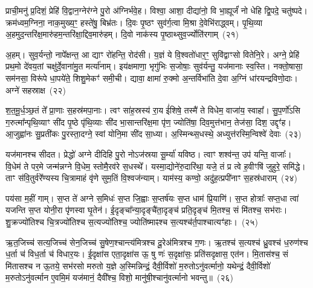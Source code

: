 {\anuvakamend[{दी॒या॒ दा॒यो ज॑यन्त्व॒मित्रा॒न्प्र च॑त्वारि॒ꣳ॒शच्च॑}]}%

प्राची॒मनु॑ प्र॒दिशं॒ प्रेहि॑ वि॒द्वान॒ग्नेर॑ग्ने पु॒रो अ॑ग्निर्भवे॒ह। विश्वा॒ आशा॒ दीद्या॑नो॒ वि भा॒ह्यूर्जं॑ नो धेहि द्वि॒पदे॒ चतु॑ष्पदे। क्रम॑ध्वम॒ग्निना॒ नाक॒मुख्य॒ꣳ॒ हस्ते॑षु॒ बिभ्र॑तः। दि॒वः पृ॒ष्ठꣳ सुव॑र्ग॒त्वा मि॒श्रा दे॒वेभि॑राद्ध्वम्। पृ॒थि॒व्या अ॒हमुद॒न्तरि॑क्ष॒मारु॑हम॒न्तरि॑क्षा॒द्दिव॒मारु॑हम्। दि॒वो नाक॑स्य पृ॒ष्ठाथ्सुव॒र्ज्योति॑रगाम्~(२१)

अ॒हम्। सुव॒र्यन्तो॒ नापे᳚क्षन्त॒ आ द्याꣳ रो॑हन्ति॒ रोद॑सी। य॒ज्ञं ये वि॒श्वतो॑धार॒ꣳ॒ सुवि॑द्वाꣳसो वितेनि॒रे। अग्ने॒ प्रेहि॑ प्रथ॒मो दे॑वय॒तां चक्षु॑र्दे॒वाना॑मु॒त मर्त्या॑नाम्। इय॑क्षमाणा॒ भृगु॑भिः स॒जोषाः॒ सुव॑र्यन्तु॒ यज॑मानाः स्व॒स्ति। नक्तो॒षासा॒ सम॑नसा॒ विरू॑पे धा॒पये॑ते॒ शिशु॒मेकꣳ॑ समी॒ची। द्यावा॒ क्षामा॑ रु॒क्मो अ॒न्तर्विभा॑ति दे॒वा अ॒ग्निं धा॑रयन्द्रविणो॒दाः। अग्ने॑ सहस्राक्ष~(२२)

श॒त॒मू॒र्ध॒ञ्छ॒तं ते᳚ प्रा॒णाः स॒हस्र॑मपा॒नाः। त्वꣳ सा॑ह॒स्रस्य॑ रा॒य ई॑शिषे॒ तस्मै॑ ते विधेम॒ वाजा॑य॒ स्वाहा᳚। सु॒प॒र्णो॑\-ऽसि ग॒रुत्मा᳚न्पृथि॒व्याꣳ सी॑द पृ॒ष्ठे पृ॑थि॒व्याः सी॑द भा॒सान्तरि॑क्ष॒मा पृ॑ण॒ ज्योति॑षा॒ दिव॒मुत्त॑भान॒ तेज॑सा॒ दिश॒ उद्दृꣳ॑ह। आ॒जुह्वा॑नः सु॒प्रती॑कः पु॒रस्ता॒दग्ने॒ स्वां योनि॒मा सी॑द सा॒ध्या। अ॒स्मिन्थ्स॒धस्थे॒ अध्युत्त॑रस्मि॒न्विश्वे॑ देवाः~(२३)

यज॑मानश्च सीदत। प्रेद्धो॑ अग्ने दीदिहि पु॒रो नो\-ऽज॑स्रया सू॒र्म्या॑ यविष्ठ। त्वाꣳ शश्व॑न्त॒ उप॑ यन्ति॒ वाजाः᳚। वि॒धेम॑ ते पर॒मे जन्म॑न्नग्ने वि॒धेम॒ स्तोमै॒रव॑रे स॒धस्थे᳚। यस्मा॒द्योने॑रु॒दारि॑था॒ यजे॒ तं प्र त्वे ह॒वीꣳषि॑ जुहुरे॒ समि॑द्धे। ताꣳ स॑वि॒तुर्वरे᳚ण्यस्य चि॒त्रामाहं वृ॑णे सुम॒तिं वि॒श्वज॑न्याम्। याम॑स्य॒ कण्वो॒ अदु॑ह॒त्प्रपी॑नाꣳ स॒हस्र॑धाराम्~(२४)

पय॑सा म॒हीं गाम्। स॒प्त ते॑ अग्ने स॒मिधः॑ स॒प्त जि॒ह्वाः स॒प्तर्\mbox{}ष॑यः स॒प्त धाम॑ प्रि॒याणि॑। स॒प्त होत्राः᳚ सप्त॒धा त्वा॑ यजन्ति स॒प्त योनी॒रा पृ॑णस्वा घृ॒तेन॑। ई॒दृङ्चा᳚न्या॒दृङ्चै॑ता॒दृङ्च॑ प्रति॒दृङ्च॑ मि॒तश्च॒ सं मि॑तश्च॒ सभ॑राः। शु॒क्रज्यो॑तिश्च चि॒त्रज्यो॑तिश्च स॒त्यज्यो॑तिश्च॒ ज्योति॑ष्माꣴश्च स॒त्यश्च॑र्त॒पाश्चात्यꣳ॑हाः।~(२५)

ऋ॒त॒जिच्च॑ सत्य॒जिच्च॑ सेन॒जिच्च॑ सु॒षेण॒श्चान्त्य॑मित्रश्च दू॒रेअ॑मित्रश्च ग॒णः। ऋ॒तश्च॑ स॒त्यश्च॑ ध्रु॒वश्च॑ ध॒रुण॑श्च ध॒र्ता च॑ विध॒र्ता च॑ विधार॒यः। ई॒दृक्षा॑स एता॒दृक्षा॑स ऊ॒ षु णः॑ स॒दृक्षा॑सः॒ प्रति॑सदृक्षास॒ एत॑न। मि॒तास॑श्च॒ सं मि॑तासश्च न ऊ॒तये॒ सभ॑रसो मरुतो य॒ज्ञे अ॒स्मिन्निन्द्रं॒ दैवी॒र्विशो॑ म॒रुतो\-ऽनु॑वर्त्मानो॒ यथेन्द्रं॒ दैवी॒र्विशो॑ म॒रुतो\-ऽनु॑वर्त्मान ए॒वमि॒मं यज॑मानं॒ दैवी᳚श्च॒ विशो॒ मानु॑षी॒श्चानु॑वर्त्मानो भवन्तु॥~(२६)


